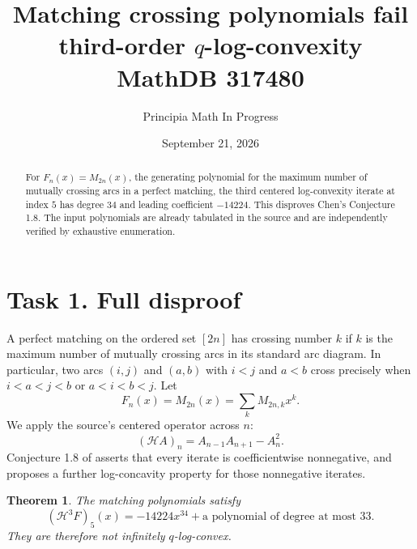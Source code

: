 \documentclass[11pt]{article}
\title{Matching crossing polynomials fail third-order $q$-log-convexity\\\large MathDB 317480}
\author{Principia Math In Progress}
\date{September 21, 2026}
\newtheorem{theorem}{Theorem}
\newcommand{\HH}{\mathcal H}
\begin{document}
\maketitle
\begin{abstract}
For $F_n(x)=M_{2n}(x)$, the generating polynomial for the
maximum number of mutually crossing arcs in a perfect matching,
the third centered log-convexity iterate at index $5$ has degree
$34$ and leading coefficient $-14224$. This disproves Chen's
Conjecture 1.8. The input polynomials are already tabulated in
the source and are independently verified by exhaustive enumeration.
\end{abstract}

\section*{Task 1. Full disproof}
A perfect matching on the ordered set $[2n]$ has crossing
number $k$ if $k$ is the maximum number of mutually crossing
arcs in its standard arc diagram. In particular, two arcs
$(i,j)$ and $(a,b)$ with $i<j$ and $a<b$ cross precisely when
$i<a<j<b$ or $a<i<b<j$. Let
\[
 F_n(x)=M_{2n}(x)=\sum_k M_{2n,k}x^k.
\]
We apply the source's centered operator across $n$:
\[
 (\HH A)_n=A_{n-1}A_{n+1}-A_n^2.
\]
Conjecture 1.8 of \cite{Chen} asserts that every iterate is
coefficientwise nonnegative, and proposes a further
log-concavity property for those nonnegative iterates.

\begin{theorem}
The matching polynomials satisfy
\[
 (\HH^3F)_5(x)=-14224x^{34}
              +\text{a polynomial of degree at most }33.       \tag{1}
\]
They are therefore not infinitely $q$-log-convex.
\end{theorem}
\end{document}
